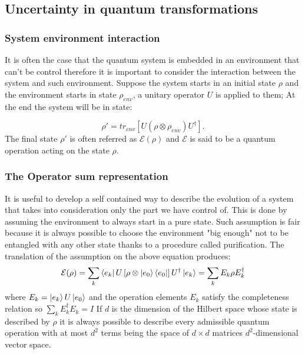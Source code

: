 \documentclass{article}
\begin{document}
\subsection{Uncertainty in quantum transformations}

\subsubsection{System environment interaction}

It is often the case that the quantum system is embedded in an environment
that can't be control therefore it is important to consider the interaction
between the system and such environment.
Suppose the system starts in an initial state $\rho$ and the environment
starts in state $\rho_{env}$,
a unitary operator $U$ is
applied to them;
At the end the system will be in state:

\begin{equation}
	\rho' = tr_{env} \left[U (\rho \otimes \rho_{env})U^\dag \right].
\end{equation}
The final state $\rho'$ is often referred as $\mathcal {E}(\rho)$ and
$\mathcal {E}$ is said to be a quantum operation acting on the state $\rho$.

\subsubsection{The Operator sum representation}

It is useful to develop a self contained way to describe the evolution
of a system that takes into consideration only the part we have control of.
This is done by assuming the environment to always start in a pure state.
Such assumption is fair because it is always possible to choose the environment
"big enough" not to be entangled with any other state thanks to a procedure
called purification.
The translation of the assumption on the above equation produces:
\begin{equation}
	\mathcal{E}(\rho) =  \sum_{k} \bra{e_k}U \left[ \rho \otimes \ket{e_0}\bra{e_0}
		\right] U^\dagger \ket{e_k} = \sum_k E_k \rho E_k^\dagger  \\
\end{equation}
where $E_k=\ket{e_k}U\ket{e_0}$ and the operation elements $E_k$ satisfy
the completeness relation so $\sum_k E_k^\dagger E_k = I$
If $d$ is the dimension of the Hilbert space whose state is described by
$\rho$ it is always possible to describe every admissible quantum operation
with at most $d^2$ terms being the space of $d \times d $ matrices $d^2$-dimensional
vector space.
\end{document}
